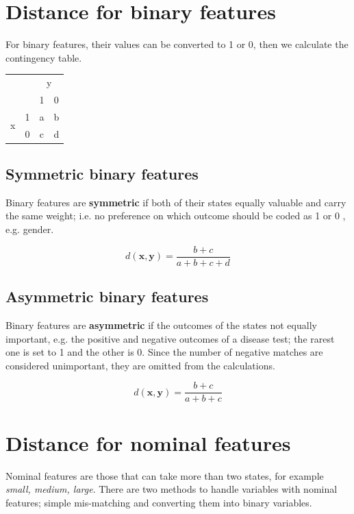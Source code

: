 \documentclass[11pt,fleqn]{book} %
\begin{document}
\section{Distance for binary features}
For binary features, their values can be converted to 1 or 0, then we calculate the contingency table.

\begin{table}[h]
\centering
\begin{tabular}{cccc}
\multicolumn{2}{c}{\multirow{2}{*}{}}       & \multicolumn{2}{c}{y} \\
\multicolumn{2}{c}{}                        & 1         & 0         \\ \cline{2-4} 
\multirow{2}{*}{x} & \multicolumn{1}{c|}{1} & a         & b         \\
                   & \multicolumn{1}{c|}{0} & c         & d        
\end{tabular}
\end{table}

\subsection*{Symmetric binary features}
Binary features are \textbf{symmetric} if both of their states equally valuable and carry the same weight; i.e. no
preference on which outcome should be coded as 1 or 0 , e.g. gender.

\begin{center}
	$$d(\mathbf{x}, \mathbf{y}) = \frac{b + c}{a + b + c + d}$$
\end{center}


\subsection*{Asymmetric binary features}
Binary features are \textbf{asymmetric} if the outcomes of the states not equally important, e.g. the positive and negative
outcomes of a disease test; the rarest one is set to 1 and the other is 0. Since the number of negative matches are considered unimportant, they are omitted from the calculations.

\begin{center}
	$$d(\mathbf{x}, \mathbf{y}) = \frac{b + c}{a + b + c}$$
\end{center}

\section{Distance for nominal features}
Nominal features are those that can take more than two states, for example {\textit{small, medium, large}}. There are two methods to handle variables with nominal features; simple mis-matching and converting them into binary variables.
\end{document}
